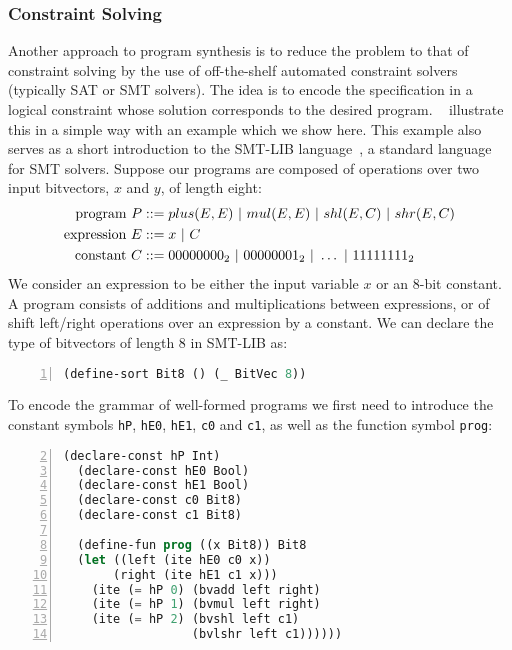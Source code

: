 \subsubsection{Constraint Solving}
\label{sec:constraint-solving}

Another approach to program synthesis is to reduce the problem to that of
constraint solving by the use of off-the-shelf automated constraint
solvers~\cite{Shi:2019:FCS,Feng:2018:PSU,Feng:2017:CST,Feng:2017:CSC,Solar-Lezama:2008,Jha:oracle:2010}
(typically SAT or SMT solvers).
The idea is to encode the specification in a logical constraint whose solution
corresponds to the desired program.
\citeauthor{Gulwani2017}~\cite{Gulwani2017} illustrate this in a simple way with
an example which we show here.
This example also serves as a short introduction to the SMT-LIB
language~\cite{BarFT-RR-17}, a standard language for SMT solvers.
Suppose our programs are composed of operations over two input bitvectors, $x$
and $y$, of length eight:
%
\begin{align*}
  \text{program }P    &::= plus(E,E) \ |\  mul(E,E) \ |\  shl(E,C) \ |\  shr(E,C)    \\
  \text{expression }E &::= x \ |\  C                                             \\
  \text{constant }C   &::= 00000000_2 \ |\  00000001_2 \ |\  \ldots \ |\  11111111_2 \\
\end{align*}
%
\noindent
We consider an expression to be either the input variable $x$ or an 8-bit
constant.
A program consists of additions and multiplications between expressions, or of
shift left/right operations over an expression by a constant.
We can declare the type of bitvectors of length 8 in SMT-LIB as:
%
\begin{lstlisting}[language=Lisp,numbers=left,
  firstnumber=1,
  morekeywords={define-sort}]
  (define-sort Bit8 () (_ BitVec 8))
\end{lstlisting}
%
\noindent
To encode the grammar of well-formed programs we first need to introduce the
constant symbols \texttt{hP}, \texttt{hE0}, \texttt{hE1}, \texttt{c0} and
\texttt{c1}, as well as the function symbol \texttt{prog}:
%
\begin{lstlisting}[language=Lisp,
  numbers=left,
  firstnumber=2,
  morekeywords={declare-const,define-fun,ite}]
  (declare-const hP Int)
  (declare-const hE0 Bool)
  (declare-const hE1 Bool)
  (declare-const c0 Bit8)
  (declare-const c1 Bit8)

  (define-fun prog ((x Bit8)) Bit8
  (let ((left (ite hE0 c0 x))
       (right (ite hE1 c1 x)))
    (ite (= hP 0) (bvadd left right)
    (ite (= hP 1) (bvmul left right)
    (ite (= hP 2) (bvshl left c1)
                  (bvlshr left c1))))))
\end{lstlisting}
